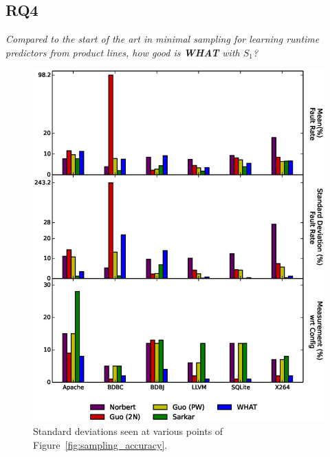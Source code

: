 \documentclass{sig-alternative}
\newcommand{\bi}{\begin{itemize}}%
\newcommand{\ei}{\end{itemize}}
\newcommand{\fig}[1]{Figure~\ref{fig:#1}}
\newcommand{\what}{{\bf WHAT }}
\begin{document}
 
\subsection{RQ4}
 
{\em Compared to the start of the art in minimal sampling for
learning runtime predictors from product lines, how good is \what with $S_1$?}\\

\begin{figure}[!t]
\includegraphics[width=0.9\linewidth]{Figures/compare_graph.eps}
\caption{Standard deviations seen at various points of  \fig{sampling_accuracy}.}\label{fig:Variance}
\end{figure}

% 

% 

% 

% 

\end{document}
